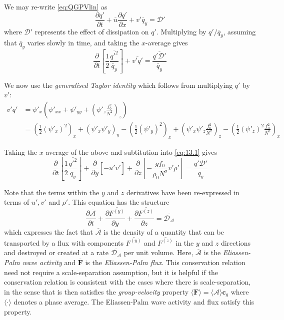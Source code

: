 \documentclass{jknotes}
\begin{document}
We may re-write \eqref{eq:QGPVlin} as
\begin{equation}
	\frac{\partial q'}{\partial t} + \overline{u} \frac{\partial q'}{\partial
	x} + v' \overline{q}_y = \mathcal{D}'
\end{equation}
where $\mathcal{D}'$ represents the effect of dissipation on $q'$. Multiplying
by $q'/\overline{q}_y$, assuming that $\overline{q}_y$ varies slowly in
time, and taking the $x$-average gives
\begin{equation}
	\frac{\partial}{\partial t}\left[ \frac{1}{2}
		\frac{\overline{q'^2}}{\overline{q}_y}\right] +\overline{v'q'} =
		\frac{\overline{q' \mathcal{D}'}}{\overline{q}_y}
		\label{eq:13.1}
\end{equation}

We now use the \emph{generalised Taylor identity} which follows from
multiplying $q'$ by $v'$:
\begin{align}
	v'q' &= \psi'_x \left(\psi'_{xx} + \psi'_{yy} + \left(\psi'_z
	\frac{f_0^2}{N^2}\right)_z\right) \\
	&= \left( \frac{1}{2} (\psi'_x)^2\right)_x + \left(\psi'_x\psi'_y\right)_y -
	\left(\frac{1}{2}(\psi'_y)^2\right)_x + \left( \psi'_x \psi'_z
		\frac{f_0^2}{N^2} \right)_z - \left(\frac{1}{2}(\psi'_z)^2
	\frac{f_0^2}{N^2}\right)_x
\end{align}

Taking the $x$-average of the above and subtitution into \eqref{eq:13.1} gives
\begin{equation}
	\frac{\partial}{\partial t}\left[ \frac{1}{2}
		\frac{\overline{q'^2}}{\overline{q}_y}\right] +
		\frac{\partial}{\partial y} \left[ -\overline{u'v'}\right] +
		\frac{\partial}{\partial z} \left[ -\frac{gf_0}{\rho_0N^2}
		\overline{v'\rho'}\right]	
		= \frac{\overline{q' \mathcal{D}'}}{\overline{q}_y}
\end{equation}

Note that the terms within the $y$ and $z$ derivatives have been re-expressed
in terms of $u', v'$ and $\rho'$. This equation has the structure
\begin{equation}
	\frac{\partial \overline{\mathcal{A}}}{\partial t} + \frac{\partial
		\overline{F^{(y)}}}{\partial y} + \frac{\partial
	\overline{F^{(z)}}}{\partial z} = \overline{\mathcal{D}_{\mathcal{A}}}
\end{equation}
which expresses the fact that $\overline{\mathcal{A}}$ is the density of a
quantity that can be transported by a flux with components $\overline{F^{(y)}}
$ and $\overline{F^{(z)}}$ in the $y$ and $z$ directions and destroyed or
created at a rate $\overline{\mathcal{D}_{\mathcal{A}}}$ per unit volume.
Here, $\overline{\mathcal{A}}$ is the \emph{Eliassen-Palm wave activity} and
$\overline{\symbf{F}}$ is the \emph{Eliassen-Palm flux}. This conservation relation
need not require a scale-separation assumption, but it is helpful if the
conservation relation is consistent with the cases where there is
scale-separation, in the sense that is then satisfies the
\emph{group-velocity} property $\langle \symbf{F}\rangle = \langle
\mathcal{A}\rangle \symbf{c}_g$ where $\langle \cdot \rangle$ denotes a phase
average. The Eliassen-Palm wave activity and flux satisfy this property.
\end{document}
